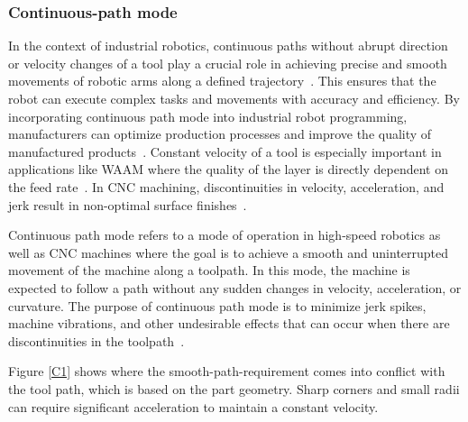 \subsubsection{Continuous-path mode}\label{CPM}
In the context of industrial robotics, continuous paths without abrupt direction or velocity changes of a tool play a crucial role in achieving precise and smooth movements of robotic arms along a defined trajectory~\cite{Jia.2018}. This ensures that the robot can execute complex tasks and movements with accuracy and efficiency. By incorporating continuous path mode into industrial robot programming, manufacturers can optimize production processes and improve the quality of manufactured products~\cite{Zhang.2020}. Constant velocity of a tool is especially important in applications like WAAM where the quality of the layer is directly dependent on the feed rate~\cite{Li.2018b}. In CNC machining, discontinuities in velocity, acceleration, and jerk result in non-optimal surface finishes~\cite{Sun.2021}.


Continuous path mode refers to a mode of operation in high-speed robotics as well as CNC machines where the goal is to achieve a smooth and uninterrupted movement of the machine along a toolpath. In this mode, the machine is expected to follow a path without any sudden changes in velocity, acceleration, or curvature. The purpose of continuous path mode is to minimize jerk spikes, machine vibrations, and other undesirable effects that can occur when there are discontinuities in the toolpath~\cite{Jia.2018, Yang.2017}.

Figure \ref{C1} shows where the smooth-path-requirement comes into conflict with the tool path, which is based on the part geometry. Sharp corners and small radii can require significant acceleration to maintain a constant velocity. 


